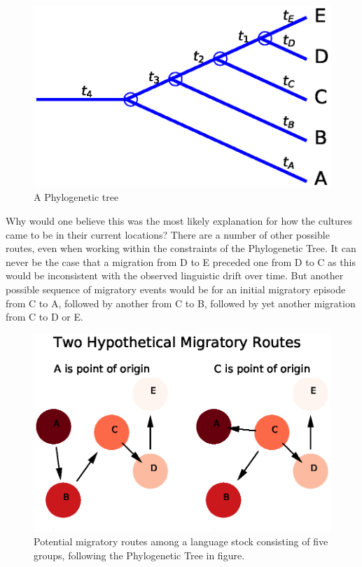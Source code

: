 \documentclass[11pt]{article}
\begin{document}
\begin{figure}
\begin{center}
\includegraphics[width=\textwidth]{AncillaryFiles//figure1.eps}
\caption{A Phylogenetic tree} \label{fig1}
\end{center} 
\end{figure}

Why would one believe this was the most likely explanation for how the cultures came to be in their current locations? There are a number of other possible routes, even when working within the constraints of the Phylogenetic Tree. It can never be the case that a migration from D to E preceded one from D to C as this would be inconsistent with the observed linguistic drift over time. But another possible  sequence of migratory events would be for an initial migratory episode from C to A, followed by another from C to B, followed by yet another migration from C to D or E.

\begin{figure}
\begin{center} 
\includegraphics[width=\textwidth]{AncillaryFiles//figure2.eps} 
\caption{Potential migratory routes among a language stock consisting of five groups, following the Phylogenetic Tree in figure.} \label{fig2}
\end{center} 
\end{figure}
\end{document}
